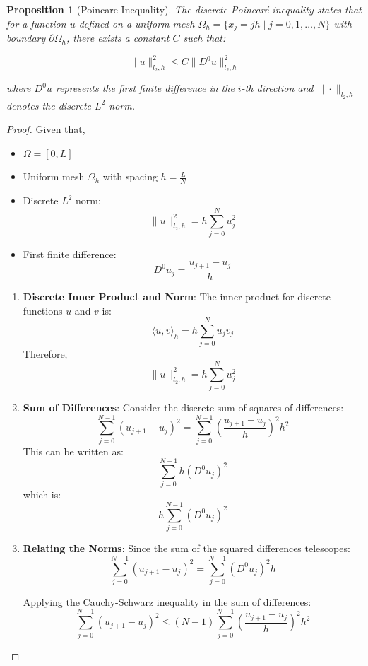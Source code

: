 \documentclass[11pt,a4paper]{article}
\theoremstyle{plain}
\newtheorem{proposition}[theorem]{Proposition}
\theoremstyle{definition}
\theoremstyle{remark}
\begin{document}
\begin{proposition}[Poincare Inequality]

The discrete Poincaré inequality states that for a function \( u \) defined on a uniform mesh \( \Omega_h = \{x_j = jh \mid j = 0, 1, \ldots, N\} \) with boundary \( \partial \Omega_h \), there exists a constant \( C \) such that:

\[
\|u\|_{l_2,h}^2 \leq C \|D^0 u\|_{l_2,h}^2
\]

where \( D^0 u \) represents the first finite difference in the \(i\)-th direction and \( \| \cdot \|_{l_2,h} \) denotes the discrete \( L^2 \) norm. 
\end{proposition}
\begin{proof}
Given that,
    \begin{itemize}
        \item \( \Omega = [0, L] \)
        \item Uniform mesh \( \Omega_h \) with spacing \( h = \frac{L}{N} \)
        \item Discrete \( L^2 \) norm: 
        \[
        \|u\|_{l_2,h}^2 = h \sum_{j=0}^{N} u_j^2
        \]
        \item First finite difference:
        \[
        D^0 u_j = \frac{u_{j+1} - u_j}{h}
        \]
    \end{itemize}

\begin{enumerate}
    \item \textbf{Discrete Inner Product and Norm}:
    The inner product for discrete functions \( u \) and \( v \) is:
    \[
    \langle u, v \rangle_h = h \sum_{j=0}^{N} u_j v_j
    \]
    Therefore,
    \[
    \|u\|_{l_2,h}^2 = h \sum_{j=0}^{N} u_j^2
    \]

    \item \textbf{Sum of Differences}:
    Consider the discrete sum of squares of differences:
    \[
    \sum_{j=0}^{N-1} (u_{j+1} - u_j)^2 = \sum_{j=0}^{N-1} \left( \frac{u_{j+1} - u_j}{h} \right)^2 h^2
    \]
    This can be written as:
    \[
    \sum_{j=0}^{N-1} h (D^0 u_j)^2
    \]
    which is:
    \[
    h \sum_{j=0}^{N-1} (D^0 u_j)^2
    \]

    \item \textbf{Relating the Norms}:
    Since the sum of the squared differences telescopes:
    \[
    \sum_{j=0}^{N-1} (u_{j+1} - u_j)^2 = \sum_{j=0}^{N-1} (D^0 u_j)^2 h
    \]

    Applying the Cauchy-Schwarz inequality in the sum of differences:
    \[
    \sum_{j=0}^{N-1} (u_{j+1} - u_j)^2 \leq (N-1) \sum_{j=0}^{N-1} \left( \frac{u_{j+1} - u_j}{h} \right)^2 h^2
    \]


\end{enumerate}
\end{proof}
\end{document}
